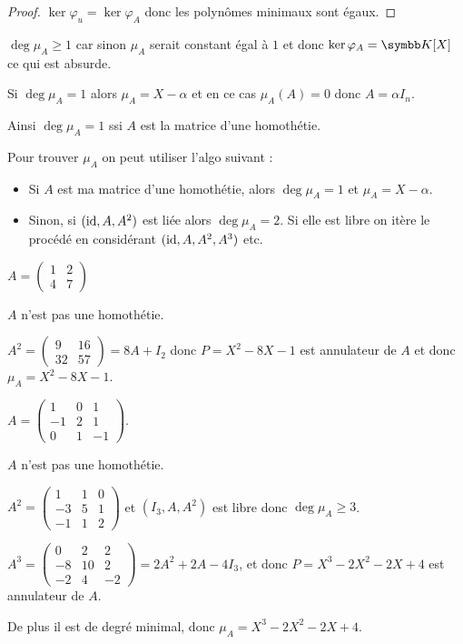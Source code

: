 \begin{proof}
    $\ker \varphi_u = \ker \varphi_A$ donc les polynômes minimaux sont égaux.
\end{proof}

\begin{remarque}
    $\deg \mu_A \geqslant 1$ car sinon $\mu_A$ serait constant égal à $1$ et donc
    $\ker \varphi_A = \K[X]$ ce qui est absurde.

    \avspace Si $\deg \mu_A = 1$ alors $\mu_A = X - \alpha$ et en ce cas 
    $\mu_A(A) = 0$ donc $A = \alpha I_n$.

    Ainsi $\deg \mu_A = 1$ ssi $A$ est la matrice d'une homothétie.

    \avspace Pour trouver $\mu_A$ on peut utiliser l'algo suivant : 
    \begin{itemize}
        \item Si $A$ est ma matrice d'une homothétie, alors $\deg \mu_A = 1$ et $\mu_A = X - \alpha$.
        \item Sinon, si $(\operatorname{id}, A, A^2)$ est liée alors $\deg \mu_A = 2$. Si elle est libre on itère 
            le procédé en considérant $(\operatorname{id}, A, A^2, A^3)$ etc.
    \end{itemize}
\end{remarque}

\begin{exemple}
    $A = \begin{pmatrix}
        1 & 2 \\
        4 & 7
    \end{pmatrix}$

    $A$ n'est pas une homothétie.

    $A^2 = \begin{pmatrix}
        9 & 16 \\
        32 & 57
    \end{pmatrix} = 8 A + I_2$ donc $P = X^2 - 8X - 1$ est annulateur de $A$ et 
    donc $\mu_A = X^2 - 8X - 1$.

    \lvspace $A = \begin{pmatrix}
        1 & 0 & 1 \\
        -1& 2 & 1 \\
        0 & 1 & -1
    \end{pmatrix}$. 

    $A$ n'est pas une homothétie.

    $A^2 = \begin{pmatrix}
        1 & 1 & 0 \\
        -3 & 5 & 1 \\
        -1 & 1 & 2
    \end{pmatrix}$ et $(I_3, A, A^2)$ est libre donc $\deg \mu_A \geqslant 3$.

    $A^3 = \begin{pmatrix}
        0 & 2 & 2 \\
        -8 & 10 & 2 \\
        -2 & 4 & -2
    \end{pmatrix} = 2 A^2 + 2A - 4 I_3$, et donc $P = X^3 - 2X^2 - 2X + 4$ est annulateur de $A$.

    De plus il est de degré minimal, donc $\mu_A = X^3 - 2X^2 - 2X + 4$.
\end{exemple}

